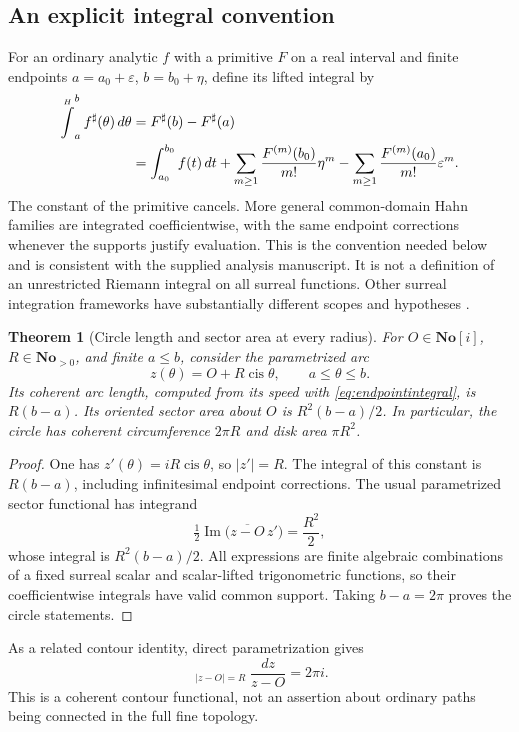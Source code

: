 \documentclass[11pt]{article}
\numberwithin{equation}{section}
\newtheorem{theorem}{Theorem}[section]
\theoremstyle{definition}
\newcommand{\No}{\mathbf{No}}
\newcommand{\SC}{\mathbf{No}[i]}
\newcommand{\eps}{\varepsilon}
\newcommand{\im}{\operatorname{Im}}
\newcommand{\cis}{\operatorname{cis}}
\newcommand{\sh}{^{\sharp}}
\newcommand{\HInt}{\mathop{\overset{\scriptscriptstyle H}{\int}}\nolimits}
\begin{document}
\subsection{An explicit integral convention}
For an ordinary analytic $f$ with a primitive $F$ on a real interval and finite endpoints $a=a_0+\eps$, $b=b_0+\eta$, define its lifted integral by
\begin{align}
 \HInt_a^b f\sh(\theta)\,d\theta
 &=F\sh(b)-F\sh(a)\label{eq:endpointintegral}\\
 &=\int_{a_0}^{b_0}f(t)\,dt
 +\sum_{m\ge1}\frac{F^{(m)}(b_0)}{m!}\eta^m
 -\sum_{m\ge1}\frac{F^{(m)}(a_0)}{m!}\eps^m.\notag
\end{align}
The constant of the primitive cancels. More general common-domain Hahn families are integrated coefficientwise, with the same endpoint corrections whenever the supports justify evaluation. This is the convention needed below and is consistent with the supplied analysis manuscript. It is not a definition of an unrestricted Riemann integral on all surreal functions. Other surreal integration frameworks have substantially different scopes and hypotheses \cite{CE}.

\begin{theorem}[Circle length and sector area at every radius]\label{thm:arcs}
For $O\in\SC$, $R\in\No_{>0}$, and finite $a\le b$, consider the parametrized arc
\[
 z(\theta)=O+R\cis\theta,\qquad a\le\theta\le b.
\]
Its coherent arc length, computed from its speed with \eqref{eq:endpointintegral}, is $R(b-a)$. Its oriented sector area about $O$ is $R^2(b-a)/2$. In particular, the circle has coherent circumference $2\pi R$ and disk area $\pi R^2$.
\end{theorem}
\begin{proof}
One has $z'(\theta)=iR\cis\theta$, so $|z'|=R$. The integral of this constant is $R(b-a)$, including infinitesimal endpoint corrections. The usual parametrized sector functional has integrand
\[
 \tfrac12\im\bigl(\overline{z-O}\,z'\bigr)=\frac{R^2}{2},
\]
whose integral is $R^2(b-a)/2$. All expressions are finite algebraic combinations of a fixed surreal scalar and scalar-lifted trigonometric functions, so their coefficientwise integrals have valid common support. Taking $b-a=2\pi$ proves the circle statements.
\end{proof}
As a related contour identity, direct parametrization gives
\[
 \HInt_{|z-O|=R}\frac{dz}{z-O}=2\pi i.
\]
This is a coherent contour functional, not an assertion about ordinary paths being connected in the full fine topology.
\end{document}
